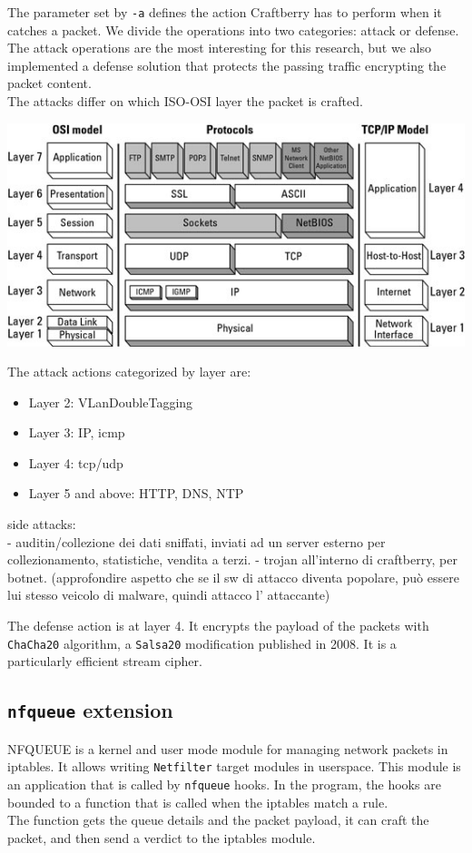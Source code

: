 \documentclass[12pt]{article}
\begin{document}
	The parameter set by \lstinline{-a} defines the action Craftberry has to perform when it catches a packet. We divide the operations into two categories: attack or defense. The attack operations are the most interesting for this research, but we also implemented a defense solution that protects the passing traffic encrypting the packet content.\\
	The attacks differ on which ISO-OSI layer the packet is crafted.\\
	
	\bigbreak

	\begin{center}
		\includegraphics[width=0.7\linewidth]{images/iso_osi_layers.jpg}
	\end{center}

	\bigbreak
	
	The attack actions categorized by layer are:
	\begin{itemize}
		\item Layer 2: VLanDoubleTagging
		\item Layer 3: IP, icmp
		\item Layer 4: tcp/udp
		\item Layer 5 and above: HTTP, DNS, NTP
	\end{itemize}

	\bigbreak
	
	side attacks:\\
	- auditin/collezione dei dati sniffati, inviati ad un server esterno per collezionamento, statistiche, vendita a terzi.
	- trojan all'interno di craftberry, per botnet. (approfondire aspetto che se il sw di attacco diventa popolare, può essere lui stesso veicolo di malware, quindi attacco l' attaccante)

	The defense action is at layer 4. It encrypts the payload of the packets with \lstinline{ChaCha20} algorithm, a \lstinline{Salsa20} modification published in 2008. It is a particularly efficient stream cipher.\\

	\subsection{\lstinline{nfqueue} extension}
	NFQUEUE is a kernel and user mode module for managing network packets in iptables. It allows writing \lstinline{Netfilter} target modules in userspace. This module is an application that is called by \lstinline{nfqueue} hooks. In the program, the hooks are bounded to a function that is called when the iptables match a rule.\\
	The function gets the queue details and the packet payload, it can craft the packet, and then send a verdict to the iptables module. 
	\bigbreak
\end{document}
